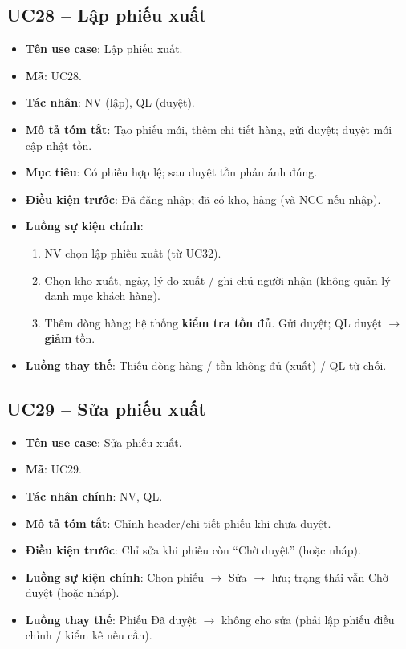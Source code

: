 \subsection{UC28 -- Lập phiếu xuất}

\begin{itemize}[leftmargin=1.5cm]
    \item \textbf{Tên use case}: Lập phiếu xuất.
    \item \textbf{Mã}: UC28.
    \item \textbf{Tác nhân}: NV (lập), QL (duyệt).
    \item \textbf{Mô tả tóm tắt}: Tạo phiếu mới, thêm chi tiết hàng, gửi duyệt; duyệt mới cập nhật tồn.
    \item \textbf{Mục tiêu}: Có phiếu hợp lệ; sau duyệt tồn phản ánh đúng.
    \item \textbf{Điều kiện trước}: Đã đăng nhập; đã có kho, hàng (và NCC nếu nhập).
    \item \textbf{Luồng sự kiện chính}:
    \begin{enumerate}
        \item NV chọn lập phiếu xuất (từ UC32).
        
        \item Chọn kho xuất, ngày, lý do xuất / ghi chú người nhận (không quản lý danh mục khách hàng).
        \item Thêm dòng hàng; hệ thống \textbf{kiểm tra tồn đủ}. Gửi duyệt; QL duyệt $\rightarrow$ \textbf{giảm} tồn.
    \end{enumerate}
    \item \textbf{Luồng thay thế}: Thiếu dòng hàng / tồn không đủ (xuất) / QL từ chối.
\end{itemize}

\subsection{UC29 -- Sửa phiếu xuất}

\begin{itemize}[leftmargin=1.5cm]
    \item \textbf{Tên use case}: Sửa phiếu xuất.
    \item \textbf{Mã}: UC29.
    \item \textbf{Tác nhân chính}: NV, QL.
    \item \textbf{Mô tả tóm tắt}: Chỉnh header/chi tiết phiếu khi chưa duyệt.
    \item \textbf{Điều kiện trước}: Chỉ sửa khi phiếu còn ``Chờ duyệt'' (hoặc nháp).
    \item \textbf{Luồng sự kiện chính}: Chọn phiếu $\rightarrow$ Sửa $\rightarrow$ lưu; trạng thái vẫn Chờ duyệt (hoặc nháp).
    \item \textbf{Luồng thay thế}: Phiếu Đã duyệt $\rightarrow$ không cho sửa (phải lập phiếu điều chỉnh / kiểm kê nếu cần).
\end{itemize}

